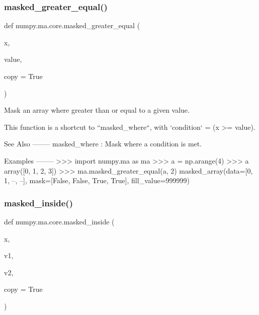 \subsubsection{\texorpdfstring{masked\+\_\+greater\+\_\+equal()}{masked\_greater\_equal()}}
{\footnotesize\ttfamily def numpy.\+ma.\+core.\+masked\+\_\+greater\+\_\+equal (\begin{DoxyParamCaption}\item[{}]{x,  }\item[{}]{value,  }\item[{}]{copy = {\ttfamily True} }\end{DoxyParamCaption})}

\begin{DoxyVerb}Mask an array where greater than or equal to a given value.

This function is a shortcut to ``masked_where``, with
`condition` = (x >= value).

See Also
--------
masked_where : Mask where a condition is met.

Examples
--------
>>> import numpy.ma as ma
>>> a = np.arange(4)
>>> a
array([0, 1, 2, 3])
>>> ma.masked_greater_equal(a, 2)
masked_array(data=[0, 1, --, --],
             mask=[False, False,  True,  True],
       fill_value=999999)\end{DoxyVerb}
 \mbox{\label{namespacenumpy_1_1ma_1_1core_a23100c958cb0127c04218abc8cb96da5}} 
\subsubsection{\texorpdfstring{masked\+\_\+inside()}{masked\_inside()}}
{\footnotesize\ttfamily def numpy.\+ma.\+core.\+masked\+\_\+inside (\begin{DoxyParamCaption}\item[{}]{x,  }\item[{}]{v1,  }\item[{}]{v2,  }\item[{}]{copy = {\ttfamily True} }\end{DoxyParamCaption})}


